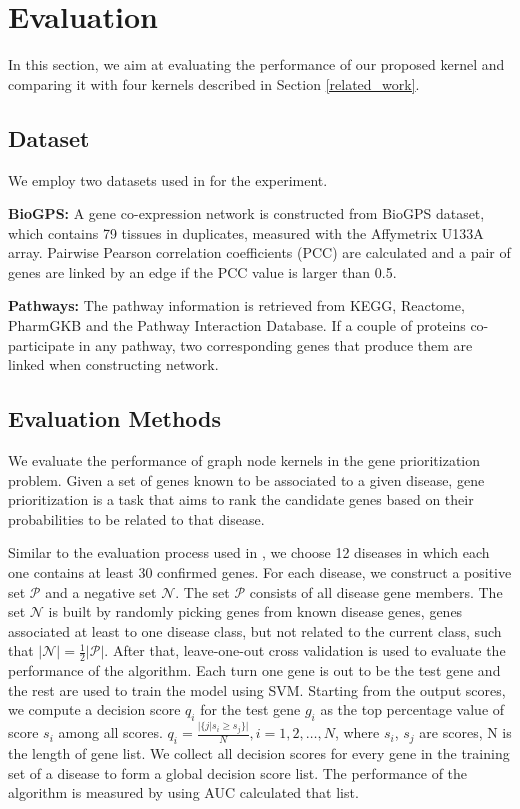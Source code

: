 \documentclass{esannV2}
\begin{document}
\section{Evaluation}
\label{evaluation}
In this section, we aim at evaluating the performance of our proposed kernel and comparing it with four kernels described in Section \ref{related_work}.
\subsection{Dataset}
We employ two datasets used in \cite{medk} for the experiment.

\textbf{BioGPS:} A gene co-expression network is constructed from BioGPS dataset, which contains 79 tissues in duplicates, measured with the Affymetrix U133A array. Pairwise Pearson correlation coefficients (PCC) are calculated and a pair of genes are linked by an edge if the PCC value is larger than 0.5.

\textbf{Pathways:} The pathway information is retrieved from KEGG, Reactome, PharmGKB and the Pathway Interaction Database. If a couple of proteins co-participate in any pathway, two corresponding genes that produce them are linked when constructing network.  
\subsection{Evaluation Methods}
We evaluate the performance of graph node kernels in the gene prioritization problem. Given a set of genes known to be associated to a given disease, gene prioritization is a task that aims to rank the candidate genes based on their probabilities to be related to that disease.

Similar to the evaluation process used in \cite{medk}, we choose 12 diseases in which each one contains at least 30 confirmed genes. For each disease, we construct a positive set $\mathcal{P}$ and a negative set $\mathcal{N}$. The set $\mathcal{P}$ consists of all disease gene members. The set $\mathcal{N}$ is built by randomly picking genes from known disease genes, genes associated at least to one disease class, but not related to the current class, such that $\vert \mathcal{N} \vert = \frac{1}{2} \vert \mathcal{P} \vert$. After that, leave-one-out cross validation is used to evaluate the performance of the algorithm. Each turn one gene is out to be the test gene and the rest are used to train the model using SVM. Starting from the output scores, we compute a decision score $q_i$ for the test gene $g_i$ as the top percentage value of score $s_i$ among all scores. $q_{i} = \frac{\vert \{j\vert s_{i} \geq s_{j}  \rbrace \vert}{N}, i = 1,2,\ldots,N$, where $s_i$, $s_j$ are scores, N is the length of gene list. We collect all decision scores for every gene in the training set of a disease to form a global decision score list. The performance of the algorithm is measured by using AUC calculated that list. 
\end{document}
